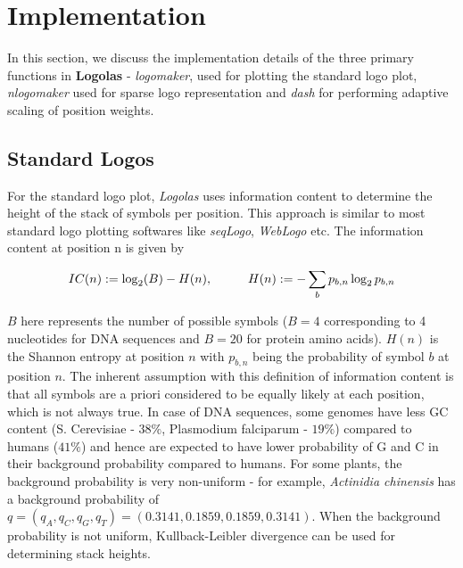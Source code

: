 \documentclass{bmcart}
\begin{document}

\section*{Implementation}

In this section, we discuss the implementation details of the three primary functions in \textbf{Logolas} - \textit{logomaker}, used for plotting the standard logo plot, \textit{nlogomaker} used for sparse logo representation and \textit{dash} for performing adaptive scaling of position weights.

\subsection*{Standard Logos}

For the standard logo plot, \textit{Logolas} uses information content to determine the height of the stack of symbols per position. This approach is similar to most standard logo plotting softwares like \textit{seqLogo}, \textit{WebLogo} etc. The information content at position n is given by  

\begin{equation}\label{ic_def}
IC (n) : = \log_{2} (B) - H (n) ,   \hspace{1 cm} H(n) : = - \sum_{b} p_{b,n} \log_{2} p_{b,n}
\end{equation}

$B$ here represents the number of possible symbols ($B=4$ corresponding to 4 nucleotides for DNA sequences and $B=20$ for protein amino acids). $H(n)$ is the Shannon entropy at position $n$ with $p_{b,n}$ being the probability of symbol $b$ at position $n$. The inherent assumption with this definition of information content is that all symbols are a priori considered to be equally likely at each position, which is not always true. In case of DNA sequences, some genomes have less GC content (S. Cerevisiae - $38\%$, Plasmodium falciparum - $19 \%$) compared to humans ($41 \%$) and hence are expected to have lower probability of G and C in their background probability compared to humans. For some plants, the background probability is very non-uniform - for example, \textit{Actinidia chinensis}  has a background probability of  $ q = (q_A, q_C, q_G, q_T) = (0.3141, 0.1859, 0.1859, 0.3141)$. When the background probability is not uniform, Kullback-Leibler divergence can be used for determining stack heights. 
\end{document}
